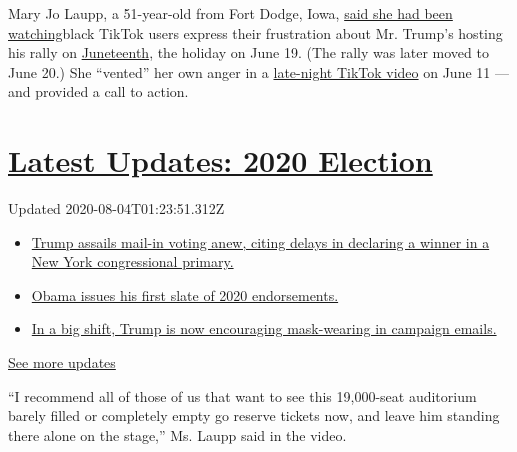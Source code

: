 Mary Jo Laupp, a 51-year-old from Fort Dodge, Iowa,
\href{https://www.dailydot.com/debug/tiktok-challenge-trump-rally/}{said
she had been watching}black TikTok users express their frustration about
Mr. Trump's hosting his rally on
\href{https://www.nytimes.com/interactive/2020/06/18/style/juneteenth-celebration.html}{Juneteenth},
the holiday on June 19. (The rally was later moved to June 20.) She
``vented'' her own anger in a
\href{https://www.tiktok.com/@maryjolaupp/video/6837311838640803078}{late-night
TikTok video} on June 11 --- and provided a call to action.

\hypertarget{latest-updates-2020-election}{%
\section{\texorpdfstring{\href{https://www.nytimes.com/2020/08/03/us/elections/biden-vs-trump.html?action=click\&pgtype=Article\&state=default\&region=MAIN_CONTENT_1\&context=storylines_live_updates}{Latest
Updates: 2020
Election}}{Latest Updates: 2020 Election}}\label{latest-updates-2020-election}}

Updated 2020-08-04T01:23:51.312Z

\begin{itemize}
\tightlist
\item
  \href{https://www.nytimes.com/2020/08/03/us/elections/biden-vs-trump.html?action=click\&pgtype=Article\&state=default\&region=MAIN_CONTENT_1\&context=storylines_live_updates\#link-6494b448}{Trump
  assails mail-in voting anew, citing delays in declaring a winner in a
  New York congressional primary.}
\item
  \href{https://www.nytimes.com/2020/08/03/us/elections/biden-vs-trump.html?action=click\&pgtype=Article\&state=default\&region=MAIN_CONTENT_1\&context=storylines_live_updates\#link-3de249e6}{Obama
  issues his first slate of 2020 endorsements.}
\item
  \href{https://www.nytimes.com/2020/08/03/us/elections/biden-vs-trump.html?action=click\&pgtype=Article\&state=default\&region=MAIN_CONTENT_1\&context=storylines_live_updates\#link-54e34d20}{In
  a big shift, Trump is now encouraging mask-wearing in campaign
  emails.}
\end{itemize}

\href{https://www.nytimes.com/2020/08/03/us/elections/biden-vs-trump.html?action=click\&pgtype=Article\&state=default\&region=MAIN_CONTENT_1\&context=storylines_live_updates}{See
more updates}

``I recommend all of those of us that want to see this 19,000-seat
auditorium barely filled or completely empty go reserve tickets now, and
leave him standing there alone on the stage,'' Ms. Laupp said in the
video.

